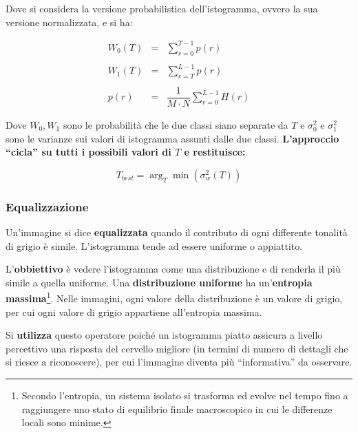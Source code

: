\documentclass[a4paper]{article}
\newcommand{\dquotes}[1]{``#1''}
\begin{document}
	\noindent
	Dove si considera la versione probabilistica dell'istogramma, ovvero la sua versione normalizzata, e si ha:
	
	\begin{equation*}
		\begin{array}{lll}
			W_{0}\left(T\right) & = & \displaystyle\sum_{r=0}^{T-1} p\left(r\right) \\
			&& \\
			W_{1}\left(T\right) & = & \displaystyle\sum_{r=T}^{L-1} p\left(r\right) \\
			&& \\
			p\left(r\right) & = & \dfrac{1}{M \cdot N} \displaystyle\sum_{r=0}^{L-1} H\left(r\right)
		\end{array}
	\end{equation*}

	\noindent
	Dove $W_{0}, W_{1}$ sono le probabilità che le due classi siano separate da $T$ e $\sigma_{0}^{2}$ e $\sigma_{1}^{2}$ sono le varianze sui valori di istogramma assunti dalle due classi. \textbf{L'approccio \dquotes{cicla} su tutti i possibili valori di $T$ e restituisce:}
	
	\begin{equation*}
		T_{best} = \arg_{T} \min \left(\sigma_{w}^{2}\left(T\right)\right)
	\end{equation*}

	\subsubsection{Equalizzazione}
	
	Un'immagine si dice \textbf{equalizzata} quando il contributo di ogni differente tonalità di grigio è simile. L'istogramma tende ad essere uniforme o appiattito.\newline
	
	\noindent
	L'\textbf{obbiettivo} è vedere l'istogramma come una distribuzione e di renderla il più simile a quella uniforme. Una \textbf{distribuzione uniforme} ha un'\textbf{entropia massima}\footnote{Secondo l'entropia, un sistema isolato si trasforma ed evolve nel tempo fino a raggiungere uno stato di equilibrio finale macroscopico in cui le differenze locali sono minime.}. Nelle immagini, ogni valore della distribuzione è un valore di grigio, per cui ogni valore di grigio appartiene all'entropia massima.\newline
	
	\noindent
	Si \textbf{utilizza} questo operatore poiché un istogramma piatto assicura a livello percettivo una risposta del cervello migliore (in termini di numero di dettagli che si riesce a riconoscere), per cui l'immagine diventa più \dquotes{informativa} da osservare.\newline
	
\end{document}
